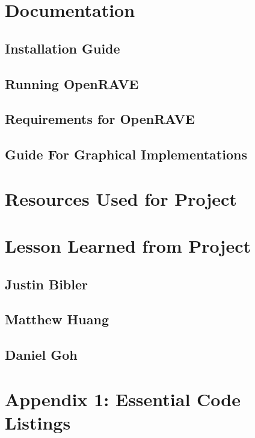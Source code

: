 \documentclass[10pt,journal,compsoc,draftclsnofoot]{IEEEtran}
\begin{document}
\begin{flushleft}
\section{Documentation}

\subsection{Installation Guide}

\subsection{Running OpenRAVE}

\subsection{Requirements for OpenRAVE}

\subsection{Guide For Graphical Implementations}


\section{Resources Used for Project}



\section{Lesson Learned from Project}

\subsection{Justin Bibler}


\subsection{Matthew Huang}


\subsection{Daniel Goh}



\section{Appendix 1: Essential Code Listings}



\end{flushleft}
\end{document}
